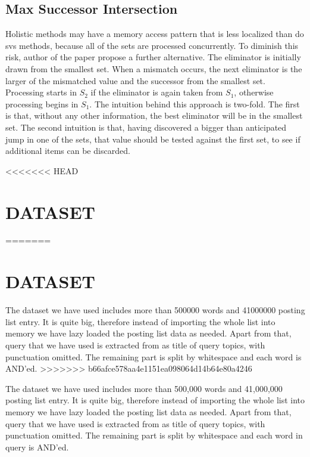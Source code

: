 \documentclass[paper=a4, fontsize=11pt]{scrartcl} %
\numberwithin{equation}{section} %
\numberwithin{figure}{section} %
\numberwithin{table}{section} %
\begin{document}
\subsection{Max Successor Intersection}

Holistic methods may have a memory access pattern that is less localized than do svs methods, because all of the sets are processed concurrently. To diminish this risk, author of the paper propose a further alternative. The eliminator is initially drawn from the smallest set. When a mismatch occurs, the next eliminator is the larger of the mismatched value and the successor from the smallest set. Processing starts in $S_{2}$ if the eliminator is again taken from $S_{1}$, otherwise processing begins in $S_{1}$. The intuition behind this approach is two-fold. The first is that, without any other information, the best eliminator will be in the smallest set. The second intuition is that, having discovered a bigger than anticipated jump in one of the sets, that value should be tested against the first set, to see if additional items can be discarded.

<<<<<<< HEAD

\section{DATASET}
=======
\newpage
\section{DATASET}
The dataset we have used includes more than 500000 words and 41000000 posting list entry. It is quite big, therefore instead of importing the whole list into memory we have lazy loaded the posting list data as needed. Apart from that, query that we have used is extracted from as title of query topics, with punctuation omitted. The remaining part is split by whitespace and each word is AND'ed.
>>>>>>> b66afce578aa4e1151ea098064d14b64e80a4246

The dataset we have used includes more than 500,000 words and 41,000,000 posting list entry. It is quite big, therefore instead of importing the whole list into memory we have lazy loaded the posting list data as needed. Apart from that, query that we have used is extracted from as title of query topics, with punctuation omitted. The remaining part is split by whitespace and each word in query is AND'ed.

\newpage
\end{document}
